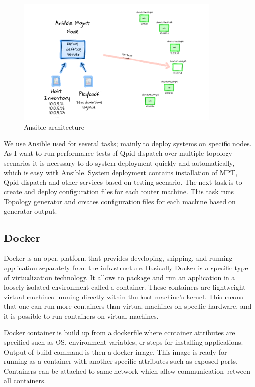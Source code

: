 \begin{figure}[H]
  \centering
  \includegraphics[width=10cm]{obrazky-figures/ansible.png}
  \caption{Ansible architecture. }
  \label{fig:ansible_architecture}
\end{figure}

We use Ansible used for several tasks; mainly to deploy systems on specific nodes. As I want to run performance tests of Qpid-dispatch over multiple topology scenarios it is necessary to do system deployment quickly and automatically, which is easy with Ansible. System deployment contains installation of MPT, Qpid-dispatch and other services based on testing scenario. The next task is to create and deploy configuration files for each router machine. This task runs Topology generator and creates configuration files for each machine based on generator output.


\subsection{Docker}
Docker \cite{Docker} is an open platform that provides developing, shipping, and running application separately from the infrastructure. Basically Docker is a specific type of virtualization technology. It allows to package and run an application in a loosely isolated environment called a container. These containers are lightweight virtual machines running directly within the host machine's kernel. This means that one can run more containers than virtual machines on specific hardware, and it is possible to run containers on virtual machines.

Docker container is build up from a dockerfile where container attributes are specified such as OS, environment variables, or steps for installing applications. Output of build command is then a docker image. This image is ready for running as a container with another specific attributes such as exposed ports. Containers can be attached to same network which allow communication between all containers.

